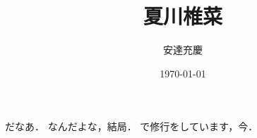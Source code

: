 \documentclass[uplatex,dvipdfmx]{jsarticle}
\title{夏川椎菜}
\author{安達充慶}
\date{\today}
\begin{document}
\maketitle

\cite{Bott--Tu}だなあ．
\cite{今野微分幾何学}なんだよな，結局．
\cite{Audin--Damian}で修行をしています，今．
\cite{Bott--Tu}
\cite{LeeSmooth}
\cite{}



\end{document}
